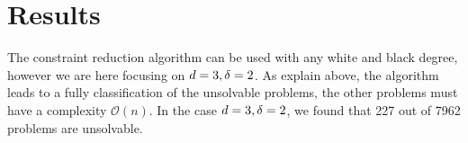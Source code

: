\section{Results}
The constraint reduction algorithm can be used with any white and black degree, however we are here focusing on $d = 3, \delta = 2$.
As explain above, the algorithm leads to a fully classification of the unsolvable problems, the other problems must have a complexity  $\mathcal{O}(n)$. In the case $d = 3, \delta = 2$, we found that 227 out of 7962 problems are unsolvable.